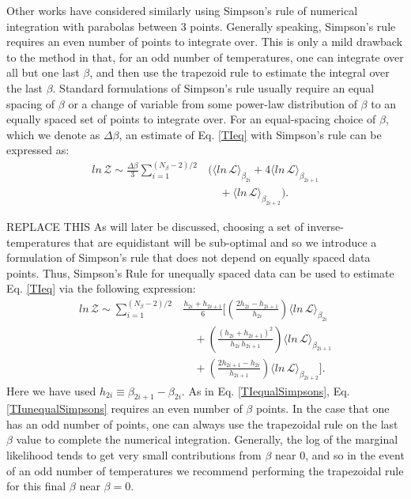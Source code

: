 Other works have considered similarly using Simpson's rule of numerical integration with parabolas between 3 points. Generally speaking, Simpson's rule requires an even number of points to integrate over. This is only a mild drawback to the method in that, for an odd number of temperatures, one can integrate over all but one last $\beta$, and then use the trapezoid rule to estimate the integral over the last $\beta$. Standard formulations of Simpson's rule usually require an equal spacing of $\beta$ or a change of variable from some power-law distribution of $\beta$ to an equally spaced set of points to integrate over. For an equal-spacing choice of $\beta$, which we denote as $\Delta \beta$, an estimate of Eq. \ref{TIeq} with Simpson's rule can be expressed as:
\begin{equation}\label{TIequalSimpsons}
\begin{split}
    ln \, \mathcal{Z} \sim \frac{\Delta \beta}{3} \sum^{(N_{\beta}-2)/2}_{i=1} &
    \big(\langle ln \, \mathcal{L} \rangle_{\beta_{2i}} + 4 \langle ln \, \mathcal{L} \rangle_{\beta_{2i+1}} \\
    & \quad + \langle ln \, \mathcal{L} \rangle_{\beta_{2i+2}} \big).
\end{split}
\end{equation}

REPLACE THIS
As will later be discussed, choosing a set of inverse-temperatures that are equidistant will be sub-optimal and so we introduce a formulation of Simpson's rule that does not depend on equally spaced data points. Thus, Simpson's Rule for unequally spaced data can be used to estimate Eq. \ref{TIeq} via the following expression:
\begin{equation}\label{TIunequalSimpsons}
\begin{split}
ln \, \mathcal{Z} \sim \sum_{i=1}^{(N_\beta-2) / 2} & \frac{h_{2i} + h_{2i+1}}{6}
 \bigg [\left(\frac{2h_{2i} - h_{2i+1}}{h_{2i}} \right) \langle ln \, \mathcal{L} \rangle_{\beta_{2i}} \\
& \quad  + \left(\frac{(h_{2i} + h_{2i+1})^2}{h_{2i} \, h_{2i+1}} \right) \langle ln \, \mathcal{L} \rangle_{\beta_{2i+1}}  \\
& \quad + \left(\frac{2h_{2i+1} - h_{2i}}{h_{2i+1}} \right) \langle ln \, \mathcal{L} \rangle_{\beta_{2i+2}} \bigg ].
\end{split}
\end{equation}
Here we have used $h_{2i} \equiv \beta_{2i+1} - \beta_{2i}$. As in Eq. \ref{TIequalSimpsons}, Eq. \ref{TIunequalSimpsons} requires an even number of $\beta$ points. In the case that one has an odd number of points, one can always use the trapezoidal rule on the last $\beta$ value to complete the numerical integration. Generally, the log of the marginal likelihood tends to get very small contributions from $\beta$ near 0, and so in the event of an odd number of temperatures we recommend performing the trapezoidal rule for this final $\beta$ near $\beta = 0$.

